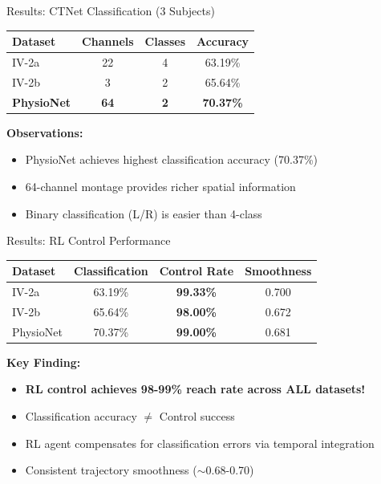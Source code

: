 \documentclass[aspectratio=169, 11pt]{beamer}
\begin{document}
\begin{frame}{Results: CTNet Classification (3 Subjects)}
    \begin{center}
    \begin{tabular}{lccc}
        \toprule
        \textbf{Dataset} & \textbf{Channels} & \textbf{Classes} & \textbf{Accuracy} \\
        \midrule
        IV-2a & 22 & 4 & 63.19\% \\
        IV-2b & 3 & 2 & 65.64\% \\
        \textbf{PhysioNet} & \textbf{64} & \textbf{2} & \textbf{70.37\%} \\
        \bottomrule
    \end{tabular}
    \end{center}
    
    \vspace{5mm}
    \textbf{Observations:}
    \begin{itemize}
        \item PhysioNet achieves highest classification accuracy (70.37\%)
        \item 64-channel montage provides richer spatial information
        \item Binary classification (L/R) is easier than 4-class
    \end{itemize}
\end{frame}

\begin{frame}{Results: RL Control Performance}
    \begin{center}
    \begin{tabular}{lccc}
        \toprule
        \textbf{Dataset} & \textbf{Classification} & \textbf{Control Rate} & \textbf{Smoothness} \\
        \midrule
        IV-2a & 63.19\% & \textcolor{green!60!black}{\textbf{99.33\%}} & 0.700 \\
        IV-2b & 65.64\% & \textcolor{green!60!black}{\textbf{98.00\%}} & 0.672 \\
        PhysioNet & 70.37\% & \textcolor{green!60!black}{\textbf{99.00\%}} & 0.681 \\
        \bottomrule
    \end{tabular}
    \end{center}
    
    \vspace{5mm}
    \textbf{Key Finding:}
    \begin{itemize}
        \item \textbf{RL control achieves 98-99\% reach rate across ALL datasets!}
        \item Classification accuracy $\neq$ Control success
        \item RL agent compensates for classification errors via temporal integration
        \item Consistent trajectory smoothness ($\sim$0.68-0.70)
    \end{itemize}
\end{frame}
\end{document}
